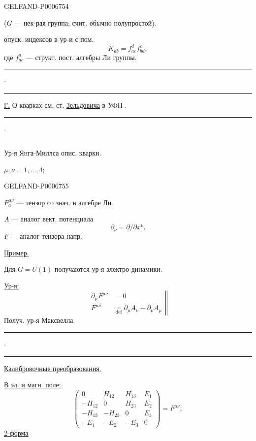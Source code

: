\begin{GelfandAdjacentEvidence}{GELFAND-P000675}{4}


(\(G\) --- нек-рая группа; счит. обычно полупростой).

опуск. индексов в ур-и с пом.
\[
K_{ab}=f_{ac}^d f_{bd}^c,
\]
где \(f_{ac}^d\) --- структ. пост. алгебры Ли группы.

\noindent\rule{9mm}{.45pt}\enspace\(\cdot\)\enspace\rule{12mm}{.45pt}

\underline{\underline{Г.}} О кварках см. ст. \underline{Зельдовича} в УФН .

\noindent\rule{9mm}{.45pt}\enspace\(\cdot\)\enspace\rule{12mm}{.45pt}

Ур-я Янга-Миллса опис. кварки.

\(\mu,\nu=1,\ldots,4\);
\end{GelfandAdjacentEvidence}
\begin{GelfandAdjacentEvidence}{GELFAND-P000675}{5}

\(F_a^{\mu\nu}\) --- тензор со знач. в алгебре Ли.

\(A\) --- аналог вект. потенциала
\[
\partial_\nu=\partial/\partial x^\nu.
\]
\(F\) --- аналог тензора напр.

\underline{Пример.}

Для \(G=U(1)\) получаются ур-я электро-динамики.

\underline{Ур-я:}
\[
\left.
\begin{aligned}
\partial_\mu F^{\mu\nu}&=0\\
F^{\mu\nu}&\underset{\mathrm{def}}{=}\partial_\mu A_\nu-\partial_\nu A_\mu
\end{aligned}
\right\Vert
\]
Получ. ур-я Максвелла.

\noindent\rule{10mm}{.45pt}\enspace\(\cdot\)\enspace\rule{12mm}{.45pt}

\underline{Калибровочные преобразования.}

\underline{В эл. и магн. поле:}
\[
\begin{pmatrix}
0&H_{12}&H_{13}&E_1\\
-H_{12}&0&H_{23}&E_2\\
-H_{13}&-H_{23}&0&E_3\\
-E_1&-E_2&-E_3&0
\end{pmatrix}
=F^{\mu\nu};
\]
\underline{2-форма}
\end{GelfandAdjacentEvidence}
